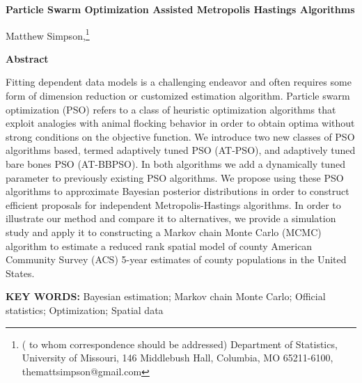 \documentclass[12pt]{article}
\begin{document}
\thispagestyle{empty} \baselineskip=28pt

\begin{center}
{\LARGE{\bf Particle Swarm Optimization Assisted Metropolis Hastings Algorithms}}
\end{center}

\baselineskip=12pt
\vskip 2mm
\begin{center}
Matthew Simpson,\footnote{(\baselineskip=10pt to whom correspondence should be addressed)
Department of Statistics, University of Missouri,
146 Middlebush Hall, Columbia, MO 65211-6100, themattsimpson@gmail.com}
\end{center}

\vskip 2mm
\begin{center}
{\large{\bf Abstract}}
\end{center}
Fitting dependent data models is a challenging endeavor and often requires some form of dimension reduction or customized estimation algorithm. Particle swarm optimization (PSO) refers to a class of heuristic optimization algorithms that exploit analogies with animal flocking behavior in order to obtain optima without strong conditions on the objective function. We introduce two new classes of PSO algorithms based, termed adaptively tuned PSO (AT-PSO), and adaptively tuned bare bones PSO (AT-BBPSO). In both algorithms we add a dynamically tuned parameter to previously existing PSO algorithms. We propose using these PSO algorithms to approximate Bayesian posterior distributions in order to construct efficient proposals for independent Metropolis-Hastings algorithms. In order to illustrate our method and compare it to alternatives, we provide a simulation study and apply it to constructing a Markov chain Monte Carlo (MCMC) algorithm to estimate a reduced rank spatial model of county American Community Survey (ACS) 5-year estimates of county populations in the United States.
\baselineskip=12pt 

\baselineskip=12pt
\par\vfill\noindent
{\bf KEY WORDS:} 
Bayesian estimation; Markov chain Monte Carlo; Official statistics; Optimization; Spatial data
\par\medskip\noindent


\clearpage\pagebreak\newpage {}
\baselineskip=24pt
\end{document}
